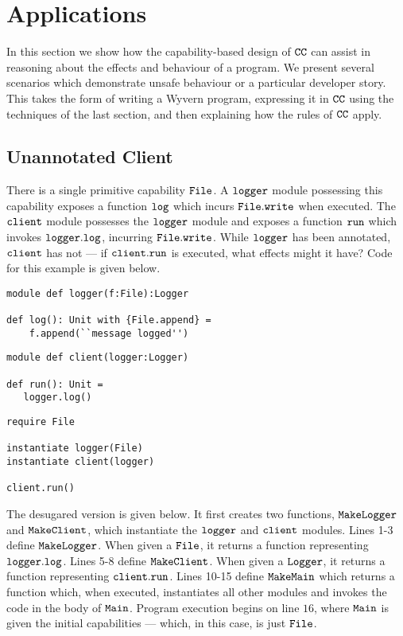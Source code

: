 \section{Applications}

In this section we show how the capability-based design of $\mathtt{CC}$ can assist in reasoning about the effects and behaviour of a program. We present several scenarios which demonstrate unsafe behaviour or a particular developer story. This takes the form of writing a Wyvern program, expressing it in $\mathtt{CC}$ using the techniques of the last section, and then explaining how the rules of $\mathtt{CC}$ apply. 


\subsection{Unannotated Client}

There is a single primitive capability $\mathtt{File}$. A $\mathtt{logger}$ module possessing this capability exposes a function $\mathtt{log}$ which incurs $\mathtt{File.write}$ when executed. The $\mathtt{client}$ module possesses the $\mathtt{logger}$ module and exposes a function $\mathtt{run}$ which invokes $\mathtt{logger.log}$, incurring $\mathtt{File.write}$. While $\mathtt{logger}$ has been annotated, $\mathtt{client}$ has not --- if $\mathtt{client.run}$ is executed, what effects might it have? Code for this example is given below. 

\begin{lstlisting}
module def logger(f:File):Logger

def log(): Unit with {File.append} =
    f.append(``message logged'')
\end{lstlisting}

\begin{lstlisting}
module def client(logger:Logger)

def run(): Unit =
   logger.log()
\end{lstlisting}

\begin{lstlisting}
require File

instantiate logger(File)
instantiate client(logger)

client.run()
\end{lstlisting}

The desugared version is given below. It first creates two functions, $\mathtt{MakeLogger}$ and $\mathtt{MakeClient}$, which instantiate the $\mathtt{logger}$ and $\mathtt{client}$ modules. Lines 1-3 define $\mathtt{MakeLogger}$. When given a $\mathtt{File}$, it returns a function representing $\mathtt{logger.log}$. Lines 5-8 define $\mathtt{MakeClient}$. When given a $\mathtt{Logger}$, it returns a function representing $\mathtt{client.run}$. Lines 10-15 define $\mathtt{MakeMain}$ which returns a function which, when executed, instantiates all other modules and invokes the code in the body of $\mathtt{Main}$. Program execution begins on line $16$, where $\mathtt{Main}$ is given the initial capabilities --- which, in this case, is just $\mathtt{File}$.

